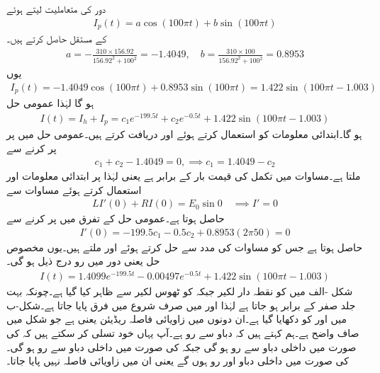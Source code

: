 دور کی متعاملیت  لیتے ہوئے 
\begin{align*}
I_p(t)=a\cos (100\pi t)+b\sin (100\pi t)
\end{align*}
کے مستقل حاصل کرتے ہیں۔
\begin{align*}
a=-\frac{310\times 156.92}{156.92^2+100^2}=-1.4049, \quad b=\frac{310\times 100}{156.92^2+100^2}=0.8953
\end{align*}
یوں 
\begin{align}
I_p(t)=-1.4049\cos (100\pi t)+0.8953\sin (100\pi t)=1.422\sin(100\pi t-1.003)
\end{align}
ہو گا لہٰذا عمومی حل
\begin{align*}
I(t)=I_h+I_p=c_1e^{-199.5t}+c_2e^{-0.5t}+1.422\sin(100\pi t-1.003)
\end{align*}
ہو گا۔ابتدائی معلومات کو استعمال کرتے ہوئے  اور  دریافت کرتے ہیں۔عمومی حل میں  پر  پر کرنے سے 
\begin{align}\label{مساوات_سادہ_دو_متجانس_حل_کا_سر_الف}
c_1+c_2-1.4049=0, \implies c_1=1.4049-c_2
\end{align}
ملتا ہے۔مساوات  میں تکمل کی قیمت بار کے برابر ہے یعنی  لہٰذا  پر ابتدائی معلومات  اور  استعمال کرتے ہوئے مساوات  سے
\begin{align*}
LI'(0)+RI(0)=E_0\sin 0 \quad \implies I'=0
\end{align*}
حاصل ہوتا ہے۔عمومی حل کے تفرق میں  پر کرنے سے
\begin{align*}
I'(0)=-199.5c_1-0.5c_2+0.8953(2\pi 50)=0
\end{align*}
حاصل ہوتا ہے جس کو مساوات  کی مدد سے حل کرتے ہوئے  اور  ملتے ہیں۔یوں مخصوص حل یعنی دور میں رو درج ذیل ہو گی۔
\begin{align*}
I(t)=1.4099e^{-199.5t}-0.00497e^{-0.5t}+1.422\sin(100\pi t-1.003)
\end{align*}
شکل -الف میں  کو نقطہ دار لکیر جبکہ  کو ٹھوس لکیر سے ظاہر کیا گیا ہے۔چونکہ  بہت جلد صفر کے برابر ہو جاتا ہے لہٰذا  اور  میں صرف شروع میں فرق پایا جاتا ہے۔شکل-ب میں  اور  کو دکھایا گیا ہے۔ان دونوں میں زاویائی فاصلہ  ریڈیئن یعنی  ہے جو شکل میں صاف واضح ہے۔ہم کہتے ہیں کہ دباو سے رو   ہے۔آپ یہاں خود تسلی کر سکتے ہیں کہ  کی صورت میں داخلی دباو سے رو  ہو گی جبکہ   کی صورت میں داخلی دباو سے رو  ہو گی۔   کی صورت میں داخلی دباو اور رو  ہوں گے یعنی ان میں زاویائی فاصلہ نہیں پایا جاتا۔
